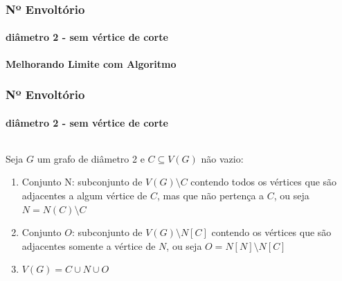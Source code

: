 \begin{frame}
\frametitle{Nº Envoltório}
\framesubtitle{diâmetro 2 - sem vértice de corte}
\centering
\textbf{Melhorando Limite com Algoritmo}
\end{frame}


\begin{frame}
\frametitle{Nº Envoltório}
\framesubtitle{diâmetro 2 - sem vértice de corte}
\begin{columns}[T]
\begin{column}{.5\textwidth}
Seja $G$ um grafo de diâmetro 2 e $C\subseteq V(G)$ não vazio:
\begin{enumerate}
\item {Conjunto N: subconjunto de $V(G)\setminus C$ contendo todos os vértices que são adjacentes a algum vértice de $C$, mas que não pertença a $C$, ou seja $N=N(C)\setminus C$}
\item {Conjunto $O$: subconjunto de $V(G)\setminus N[C]$ contendo os vértices que são adjacentes somente a vértice de $N$, ou seja $O= N[N] \setminus N[C]$}
\item {$V(G)= C \cup N \cup O$}
\end{enumerate}
\end{column}
\begin{column}{.5\textwidth}
\centering
{}
\end{column}
\end{columns}
\end{frame}


